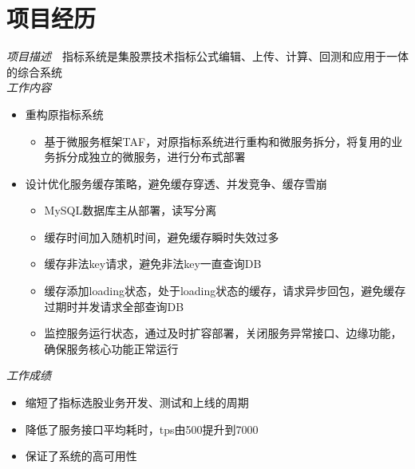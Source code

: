 \documentclass{resume}
\begin{document}
\section{项目经历}

\begin{spacing}{1.5}%
\textit{项目描述}\ \ 指标系统是集股票技术指标公式编辑、上传、计算、回测和应用于一体的综合系统\\
\textit{工作内容}
\begin{itemize}
        \item 重构原指标系统
            \begin{itemize}
                \item 基于微服务框架TAF，对原指标系统进行重构和微服务拆分，将复用的业务拆分成独立的微服务，进行分布式部署
            \end{itemize}
        \item 设计优化服务缓存策略，避免缓存穿透、并发竞争、缓存雪崩
            \begin{itemize}
                \item MySQL数据库主从部署，读写分离
                \item 缓存时间加入随机时间，避免缓存瞬时失效过多
                \item 缓存非法key请求，避免非法key一直查询DB
                \item 缓存添加loading状态，处于loading状态的缓存，请求异步回包，避免缓存过期时并发请求全部查询DB
                \item 监控服务运行状态，通过及时扩容部署，关闭服务异常接口、边缘功能，确保服务核心功能正常运行
            \end{itemize}
        \end{itemize}
\textit{工作成绩}
\begin{itemize}
        \item 缩短了指标选股业务开发、测试和上线的周期
        \item 降低了服务接口平均耗时，tps由500提升到7000
        \item 保证了系统的高可用性
        \end{itemize}
\end{spacing}
        
\end{document}
